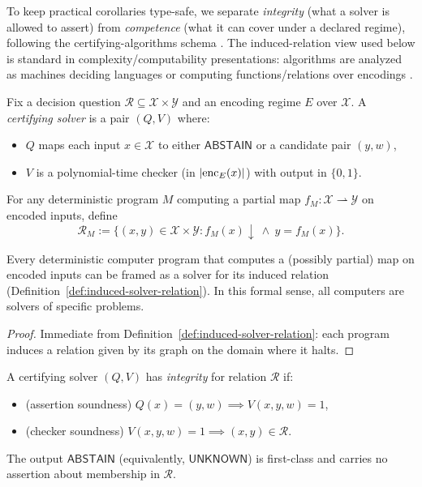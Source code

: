 To keep practical corollaries type-safe, we separate \emph{integrity} (what a solver is allowed to assert) from \emph{competence} (what it can cover under a declared regime), following the certifying-algorithms schema \cite{mcconnell2010certifying,necula1997proof}.
The induced-relation view used below is standard in complexity/computability presentations: algorithms are analyzed as machines deciding languages or computing functions/relations over encodings \cite{papadimitriou1994complexity,arora2009computational,forster2019verified}.

\begin{definition}\label{def:certifying-solver}
Fix a decision question $\mathcal{R} \subseteq \mathcal{X}\times\mathcal{Y}$ and an encoding regime $E$ over $\mathcal{X}$. A \emph{certifying solver} is a pair $(Q,V)$ where:
\begin{itemize}
\item $Q$ maps each input $x\in\mathcal{X}$ to either $\mathsf{ABSTAIN}$ or a candidate pair $(y,w)$,
\item $V$ is a polynomial-time checker (in $|{\rm enc}_E(x)|$) with output in $\{0,1\}$.
\end{itemize}
\end{definition}

\begin{definition}\label{def:induced-solver-relation}
For any deterministic program $M$ computing a partial map
$f_M:\mathcal{X}\rightharpoonup\mathcal{Y}$ on encoded inputs, define
\[
\mathcal{R}_M
:=
\{(x,y)\in\mathcal{X}\times\mathcal{Y} : f_M(x)\downarrow \ \wedge\ y=f_M(x)\}.
\]
\end{definition}

\begin{proposition}\label{prop:universal-solver-framing}
Every deterministic computer program that computes a (possibly partial) map on encoded inputs can be framed as a solver for its induced relation (Definition~\ref{def:induced-solver-relation}).
In this formal sense, all computers are solvers of specific problems.
\end{proposition}

\begin{proof}
Immediate from Definition~\ref{def:induced-solver-relation}: each program induces a relation given by its graph on the domain where it halts.
\end{proof}

\begin{definition}\label{def:solver-integrity}
A certifying solver $(Q,V)$ has \emph{integrity} for relation $\mathcal{R}$ if:
\begin{itemize}
\item (assertion soundness) $Q(x)=(y,w)\implies V(x,y,w)=1$,
\item (checker soundness) $V(x,y,w)=1\implies (x,y)\in\mathcal{R}$.
\end{itemize}
The output $\mathsf{ABSTAIN}$ (equivalently, $\mathsf{UNKNOWN}$) is first-class and carries no assertion about membership in $\mathcal{R}$.
\end{definition}

